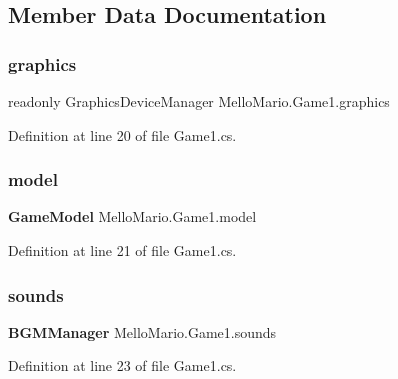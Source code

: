 \subsection{Member Data Documentation}
\mbox{\label{classMelloMario_1_1Game1_abc648a7959c7fe061e7ca456d68f9ad3}} 
\subsubsection{graphics}
{\footnotesize\ttfamily readonly Graphics\+Device\+Manager Mello\+Mario.\+Game1.\+graphics\hspace{0.3cm}{\ttfamily [private]}}



Definition at line 20 of file Game1.\+cs.

\mbox{\label{classMelloMario_1_1Game1_a8f7f07556bdafea6961c24f90386ab0c}} 
\subsubsection{model}
{\footnotesize\ttfamily \textbf{ Game\+Model} Mello\+Mario.\+Game1.\+model\hspace{0.3cm}{\ttfamily [private]}}



Definition at line 21 of file Game1.\+cs.

\mbox{\label{classMelloMario_1_1Game1_a0224f1d2531a0f824d87a9860504fe19}} 
\subsubsection{sounds}
{\footnotesize\ttfamily \textbf{ B\+G\+M\+Manager} Mello\+Mario.\+Game1.\+sounds\hspace{0.3cm}{\ttfamily [private]}}



Definition at line 23 of file Game1.\+cs.

\mbox{\label{classMelloMario_1_1Game1_a3c3d3873f2f09e47d3d9b6d6cc5c6243}} 
